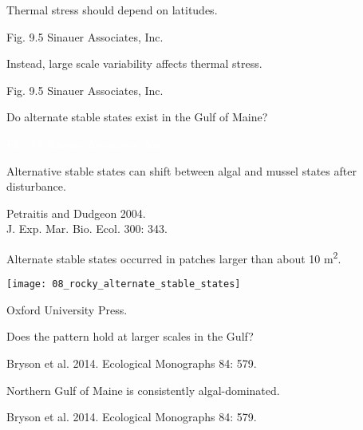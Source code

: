 \documentclass[t]{beamer}
\begin{document}
{
\begin{frame}[b]{Thermal stress should depend on latitudes.}

	\hfill \tiny Fig. 9.5 \textcopyright Sinauer Associates, Inc.
\end{frame}
}
%
{
\begin{frame}[b]{Instead, large scale variability affects thermal stress.}

	\hfill \tiny Fig. 9.5 \textcopyright Sinauer Associates, Inc.
\end{frame}
}
%
{
\begin{frame}[b]{Do alternate stable states exist in the Gulf of Maine?}

	\hfill \tiny \textcolor{white}{Fig. 9.7 \textcopyright Sinauer Associates, Inc.}
\end{frame}
}
%
{
\begin{frame}[b]{Alternative stable states can shift between algal and mussel states after disturbance.}

	\hfill \tiny Petraitis and Dudgeon 2004.\\ \hfill J. Exp. Mar. Bio. Ecol. 300: 343.
\end{frame}
}
%
\begin{frame}[t]{Alternate stable states occurred in patches larger than about 10 m\textsuperscript{2}.}


	\begin{center}
		\texttt{[image: 08\_rocky\_alternate\_stable\_states]} 
	\end{center}


	\vfilll

	\hfill \tiny \textcopyright Oxford University Press.

\end{frame}
%
{
\begin{frame}[b]{Does the pattern hold at larger scales in the Gulf?}

	\tiny Bryson et al. 2014. Ecological Monographs 84: 579.
\end{frame}
}
%
{
\begin{frame}[b]{Northern Gulf of Maine is consistently algal-dominated.}

	\tiny Bryson et al. 2014. Ecological Monographs 84: 579.
\end{frame}
}
\end{document}
